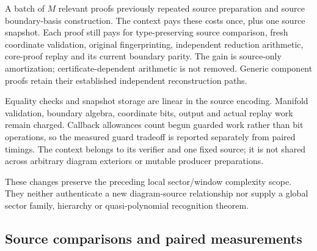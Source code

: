 A batch of $M$ relevant proofs previously repeated source preparation and
source boundary-basis construction. The context pays these costs once,
plus one source snapshot. Each proof still pays for type-preserving source
comparison, fresh coordinate validation, original fingerprinting, independent
reduction arithmetic, core-proof replay and its current boundary parity.
The gain is source-only amortization; certificate-dependent arithmetic is
not removed. Generic component proofs retain their established independent
reconstruction paths.

Equality checks and snapshot storage are linear in the source encoding.
Manifold validation, boundary algebra, coordinate bits, output and actual
replay work remain charged. Callback allowances count begun guarded work
rather than bit operations, so the measured guard tradeoff is reported
separately from paired timings. The context belongs to its verifier and
one fixed source; it is not shared across arbitrary diagram exteriors or
mutable producer preparations.

These changes preserve the preceding local sector/window complexity scope.
They neither authenticate a new diagram-source relationship nor supply a
global sector family, hierarchy or quasi-polynomial recognition theorem.

\subsection{Source comparisons and paired measurements}

